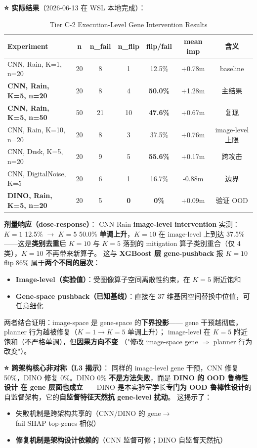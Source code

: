 \documentclass[a4paper,12pt,fontset=fandol]{ctexart}
\begin{document}
{\noindent\textbf{⭐ 实际结果}（2026-06-13 在 WSL 本地完成）：

\begin{table}[H]
\centering
\small
\caption{Tier C-2 Execution-Level Gene Intervention Results}
\label{tab:tierc2_results}
\begin{tabular}{lcccccc}
\toprule
\textbf{Experiment} & \textbf{n} & \textbf{n\_fail} & \textbf{n\_flip} & \textbf{flip/fail} & \textbf{mean imp} & \textbf{含义} \\
\midrule
CNN, Rain, K=1,  n=20 & 20 & 8  & 1  & 12.5\% & +0.78m & baseline \\
\textbf{CNN, Rain, K=5,  n=20} & 20 & 8  & 4  & \textbf{50.0\%} & +1.28m & 主结果 \\
\textbf{CNN, Rain, K=5,  n=50} & 50 & 21 & 10 & \textbf{47.6\%} & +0.67m & 复现 \\
CNN, Rain, K=10, n=20 & 20 & 8  & 3  & 37.5\% & +0.76m & image-level 上限 \\
CNN, Dusk, K=5, n=20 & 20 & 9 & 5 & \textbf{55.6\%} & +0.17m & 跨攻击 \\
CNN, DigitalNoise, K=5 & 20 & 6 & 1 & 16.7\% & -0.88m & 边界 \\
\textbf{DINO, Rain, K=5, n=20} & 20 & 5 & \textbf{0} & \textbf{0\%} & +0.09m & 验证 OOD \\
\bottomrule
\end{tabular}
\end{table}

\noindent\textbf{剂量响应（dose-response）}：
CNN Rain \textbf{image-level intervention} 实测：
$K\!=\!1$ 12.5\% $\to$ $K\!=\!5$ 50.0\% \textbf{单调上升}，$K\!=\!10$ 在 image-level 上到达
37.5\%——这是\textbf{类别去重}后 $K\!=\!10$ 与 $K\!=\!5$ 落到的 mitigation
算子类别重合（仅 4 类），$K\!=\!10$ 不再带来新算子。
这与 \textbf{XGBoost 层 gene-pushback} 报 $K\!=\!10$ flip 86\% 属于\textbf{两个不同的层次}：
\begin{itemize}
\item \textbf{Image-level（实验值）}：受图像算子空间离散性约束，在 $K\!=\!5$ 附近饱和
\item \textbf{Gene-space pushback（已知基线）}：直接在 37 维基因空间替换中位值，可任意细化
\end{itemize}
两者结合证明：image-space 是 gene-space 的\textbf{下界投影}——
gene 干预越彻底，planner 行为越被修复（$K\!=\!1 \to K\!=\!5$ 单调上升）；
image-level 在 $K\!=\!5$ 附近饱和（不严格单调），但\textbf{因果方向不变}
（"修改 image-space gene $\Rightarrow$ planner 行为改变"）。

\noindent\textbf{⭐ 跨架构核心非对称（L3 揭示）}：
同样的 image-level gene 干预，CNN 修复 50\%，DINO 修复 0\%。DINO
0\% \textbf{不是方法失败}，而是 \textbf{DINO 的 OOD 鲁棒性设计
在 gene 层面也成立}——DINO 是本实验室学长\textbf{专门为 OOD 鲁棒性设计}的
自监督架构，它的\textbf{自监督特征天然抗 gene-level 扰动}。
这揭示了：
\begin{itemize}
\item 失败机制是跨架构共享的（CNN/DINO 的 gene$\to$fail SHAP top-genes 相似）
\item \textbf{修复机制是架构设计依赖的}（CNN 监督可修；DINO 自监督天然抗）
\end{itemize}

}
\end{document}
